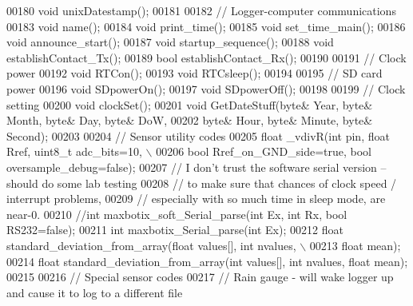\begin{DoxyCode}
00180     \textcolor{keywordtype}{void} unixDatestamp();
00181     
00182     \textcolor{comment}{// Logger-computer communications}
00183     \textcolor{keywordtype}{void} name();
00184     \textcolor{keywordtype}{void} print\_time();
00185     \textcolor{keywordtype}{void} set\_time\_main();
00186     \textcolor{keywordtype}{void} announce\_start();
00187     \textcolor{keywordtype}{void} startup\_sequence();
00188     \textcolor{keywordtype}{void} establishContact\_Tx();
00189     \textcolor{keywordtype}{bool} establishContact\_Rx();
00190     
00191     \textcolor{comment}{// Clock power}
00192     \textcolor{keywordtype}{void} RTCon();
00193     \textcolor{keywordtype}{void} RTCsleep();
00194     
00195     \textcolor{comment}{// SD card power}
00196     \textcolor{keywordtype}{void} SDpowerOn();
00197     \textcolor{keywordtype}{void} SDpowerOff();
00198     
00199     \textcolor{comment}{// Clock setting}
00200     \textcolor{keywordtype}{void} clockSet();
00201     \textcolor{keywordtype}{void} GetDateStuff(byte& Year, byte& Month, byte& Day, byte& DoW, 
00202         byte& Hour, byte& Minute, byte& Second);
00203     
00204     \textcolor{comment}{// Sensor utility codes}
00205     \textcolor{keywordtype}{float} \_vdivR(\textcolor{keywordtype}{int} pin, \textcolor{keywordtype}{float} Rref, uint8\_t adc\_bits=10, \(\backslash\)
00206           \textcolor{keywordtype}{bool} Rref\_on\_GND\_side=\textcolor{keyword}{true}, \textcolor{keywordtype}{bool} oversample\_debug=\textcolor{keyword}{false});
00207     \textcolor{comment}{// I don't trust the software serial version -- should do some lab testing }
00208     \textcolor{comment}{// to make sure that chances of clock speed / interrupt problems, }
00209     \textcolor{comment}{// especially with so much time in sleep mode, are near-0.}
00210     \textcolor{comment}{//int maxbotix\_soft\_Serial\_parse(int Ex, int Rx, bool RS232=false);}
00211     \textcolor{keywordtype}{int} maxbotix\_Serial\_parse(\textcolor{keywordtype}{int} Ex);
00212     \textcolor{keywordtype}{float} standard\_deviation\_from\_array(\textcolor{keywordtype}{float} values[], \textcolor{keywordtype}{int} nvalues, \(\backslash\)
00213           \textcolor{keywordtype}{float} mean);
00214     \textcolor{keywordtype}{float} standard\_deviation\_from\_array(\textcolor{keywordtype}{int} values[], \textcolor{keywordtype}{int} nvalues, \textcolor{keywordtype}{float} mean);
00215 
00216     \textcolor{comment}{// Special sensor codes}
00217     \textcolor{comment}{// Rain gauge - will wake logger up and cause it to log to a different file}

\end{DoxyCode}
